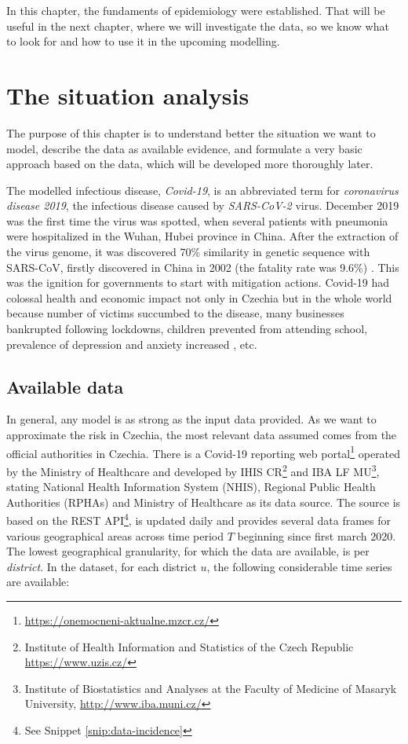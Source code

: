 \documentclass[
  digital, %
  oneside, %
  lof,     %
  lot,     %
]{fithesis4}
\begin{document}
In this chapter, the fundaments of epidemiology were established.
That will be useful in the next chapter, where we will investigate the data, so we know what to look for and how to use it in the upcoming modelling.



\chapter{The situation analysis}

The purpose of this chapter is to understand better the situation we want to model, describe the data as available evidence, and formulate a very basic approach based on the data, which will be developed more thoroughly later.

The modelled infectious disease, \textit{Covid-19}, is an abbreviated term for \textit{coronavirus disease 2019}, the infectious disease caused by \textit{SARS-CoV-2} virus. 
December 2019 was the first time the virus was spotted, when several patients with pneumonia were hospitalized in the Wuhan, Hubei province in China. 
After the extraction of the virus genome, it was discovered 70\% similarity in genetic sequence with SARS-CoV, firstly discovered in China in 2002 (the fatality rate was 9.6\%) \cite{hui2019}.
This was the ignition for governments to start with mitigation actions.
Covid-19 had colossal health and economic impact not only in Czechia but in the whole world \cite{maital2020} because number of victims succumbed to the disease, many businesses bankrupted following lockdowns, children prevented from attending school, prevalence of depression and anxiety increased \cite{khan2020}, etc.


\section{Available data}
\label{sec:available-data}

In general, any model is as strong as the input data provided.
As we want to approximate the risk in Czechia, the most relevant data assumed comes from the official authorities in Czechia.
There is a Covid-19 reporting web portal\footnote{\url{https://onemocneni-aktualne.mzcr.cz/}} operated 
by the Ministry of Healthcare and developed by IHIS CR\footnote{Institute of Health Information and Statistics of the Czech Republic \url{https://www.uzis.cz/}} and IBA LF MU\footnote{Institute of Biostatistics and Analyses at the Faculty of Medicine of Masaryk University, \url{http://www.iba.muni.cz/}}, stating National Health Information System (NHIS), Regional Public Health Authorities (RPHAs) and Ministry of Healthcare as its data source. 
The source is based on the REST API\footnote{See Snippet \ref{snip:data-incidence}}, 
is updated daily and provides several data frames for various geographical areas across time period $T$ beginning since first march 2020.
The lowest geographical granularity, for which the data are available, is per \textit{district}.
In the dataset, for each district $u$, the following considerable time series are available:
\end{document}
